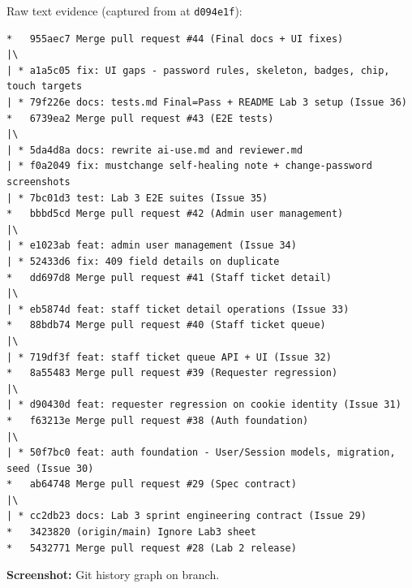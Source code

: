 \documentclass[11pt,a4paper]{article}
\begin{document}
Raw text evidence (captured from  at \texttt{d094e1f}):
\begin{lstlisting}
*   955aec7 Merge pull request #44 (Final docs + UI fixes)
|\
| * a1a5c05 fix: UI gaps - password rules, skeleton, badges, chip, touch targets
| * 79f226e docs: tests.md Final=Pass + README Lab 3 setup (Issue 36)
*   6739ea2 Merge pull request #43 (E2E tests)
|\
| * 5da4d8a docs: rewrite ai-use.md and reviewer.md
| * f0a2049 fix: mustchange self-healing note + change-password screenshots
| * 7bc01d3 test: Lab 3 E2E suites (Issue 35)
*   bbbd5cd Merge pull request #42 (Admin user management)
|\
| * e1023ab feat: admin user management (Issue 34)
| * 52433d6 fix: 409 field details on duplicate
*   dd697d8 Merge pull request #41 (Staff ticket detail)
|\
| * eb5874d feat: staff ticket detail operations (Issue 33)
*   88bdb74 Merge pull request #40 (Staff ticket queue)
|\
| * 719df3f feat: staff ticket queue API + UI (Issue 32)
*   8a55483 Merge pull request #39 (Requester regression)
|\
| * d90430d feat: requester regression on cookie identity (Issue 31)
*   f63213e Merge pull request #38 (Auth foundation)
|\
| * 50f7bc0 feat: auth foundation - User/Session models, migration, seed (Issue 30)
*   ab64748 Merge pull request #29 (Spec contract)
|\
| * cc2db23 docs: Lab 3 sprint engineering contract (Issue 29)
*   3423820 (origin/main) Ignore Lab3 sheet
*   5432771 Merge pull request #28 (Lab 2 release)
\end{lstlisting}

\noindent\textbf{Screenshot:} Git history graph on \code{lab3-staging} branch.
\end{document}
